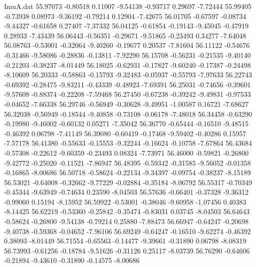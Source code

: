 \begin{filecontents}{ImuA.dat}
  55.97073   -0.80518    0.11007   -9.54138   -0.93717    0.29697   -7.72444
  55.99405   -0.73938    0.08973   -9.36192   -0.79214    0.12904   -7.42675
  56.01705   -0.67597   -0.08734   -9.44327   -0.61658    0.27407   -7.37332
  56.04125   -0.61854   -0.19143   -9.45045   -0.47919    0.28933   -7.43439
  56.06443   -0.56351   -0.29671   -9.51865   -0.23493    0.34277   -7.64048
  56.08763   -0.53001   -0.32064   -9.40260   -0.19677    0.20537   -7.81604
  56.11122   -0.54676   -0.31466   -9.58086   -0.28836   -0.13811   -7.92290
  56.15708   -0.56231   -0.21535   -9.40140   -0.21203   -0.38237   -8.01449
  56.18025   -0.62931   -0.17827   -9.60240   -0.17387   -0.24498   -8.10609
  56.20333   -0.58863   -0.15793   -9.32483   -0.05937   -0.55793   -7.97633
  56.22743   -0.69392   -0.28475   -9.83211   -0.43339   -0.48923   -7.69391
  56.25031   -0.74656   -0.39601   -9.57608   -0.88374   -0.22208   -7.59468
  56.27450   -0.67238   -0.39242   -9.49831   -0.97533   -0.04652   -7.66338
  56.29746   -0.56949   -0.30628   -9.49951   -1.00587    0.16721   -7.68627
  56.32038   -0.56949   -0.18544   -9.40858   -0.73108   -0.06178   -7.48018
  56.34458   -0.63290   -0.19980   -9.46002   -0.60132    0.05271   -7.35042
  56.36770   -0.65444   -0.16510   -9.48515   -0.46392    0.06798   -7.41149
  56.39080   -0.60419   -0.17468   -9.59402   -0.40286    0.15957   -7.57178
  56.41380   -0.55633   -0.15553   -9.32244   -0.16624   -0.10758   -7.67864
  56.43684   -0.57308   -0.22612   -9.60359   -0.23493    0.08324   -7.73971
  56.46000   -0.59821   -0.26800   -9.42772   -0.25020   -0.11521   -7.86947
  56.48395   -0.59342   -0.31585   -9.56052   -0.01358   -0.16865   -8.00686
  56.50718   -0.58624   -0.22134   -9.34397   -0.09754   -0.38237   -8.15189
  56.53021   -0.64008   -0.32662   -9.77229   -0.02884   -0.35184   -8.06792
  56.55317   -0.70349   -0.45344   -9.63949   -0.74634    0.23590   -8.04503
  56.57636   -0.66401   -0.37328   -9.36312   -0.99060    0.15194   -8.15952
  56.59922   -0.53001   -0.38046   -9.60958   -1.07456    0.40383   -8.14425
  56.62219   -0.53360   -0.25842   -9.35474   -0.83031    0.03745   -8.04503
  56.64643   -0.58624   -0.26800   -9.54138   -0.79214    0.25880   -7.88473
  56.66947   -0.64247   -0.20698   -9.40738   -0.59368   -0.04652   -7.96106
  56.69249   -0.64247   -0.16510   -9.62274   -0.46392    0.38093   -8.01449
  56.71554   -0.65563   -0.14477   -9.39661   -0.31890    0.06798   -8.08319
  56.73993   -0.61256   -0.18784   -9.51626   -0.31126    0.25117   -8.03739
  56.76290   -0.64606   -0.21894   -9.43610   -0.31890   -0.14575   -8.00686

\end{filecontents}
